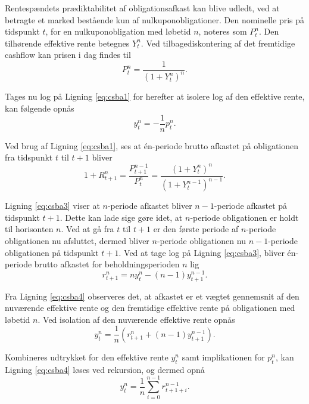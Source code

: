 \documentclass[
  a4paper,
  oneside]{memoir}
\begin{document}
Rentespændets prædiktabilitet af obligationsafkast kan blive udledt, ved at betragte et marked bestående kun af nulkuponobligationer. Den nominelle pris på tidspunkt \(t\), for en nulkuponobligation med løbetid \(n\), noteres som \(P_t^n\). Den tilhørende effektive rente betegnes \(Y_t^n\). Ved tilbagediskontering af det fremtidige cashflow kan prisen i dag findes til
\begin{equation}
P_t^n=\frac{1}{(1+Y_t^n)^n}. \label{eq:csba1}
\end{equation}

Tages nu log på Ligning \eqref{eq:csba1} for herefter at isolere log af den effektive rente, kan følgende opnås
\begin{equation}
y_t^n=-\frac{1}{n}p_t^n. \label{eq:csba2}
\end{equation}

Ved brug af Ligning \eqref{eq:csba1}, ses at én-periode brutto afkastet på obligationen fra tidspunkt \(t\) til \(t+1\) bliver
\begin{equation}
1+R_{t+1}^n=\frac{P_{t+1}^{n-1}}{P_t^n}=\frac{(1+Y_t^n)^n}{(1+Y_t^{n-1})^{n-1}}. \label{eq:csba3}
\end{equation}

Ligning \eqref{eq:csba3} viser at \(n\)-periode afkastet bliver \(n-1\)-periode afkastet på tidspunkt \(t+1\). Dette kan lade sige gøre idet, at \(n\)-periode obligationen er holdt til horisonten \(n\). Ved at gå fra \(t\) til \(t+1\) er den første periode af \(n\)-periode obligationen nu afsluttet, dermed bliver \(n\)-periode obligationen nu \(n-1\)-periode obligationen på tidspunkt \(t+1\). Ved at tage log på Ligning \eqref{eq:csba3}, bliver én-periode brutto afkastet for beholdningsperioden \(n\) lig
\begin{equation}
r_{t+1}^n=n y_t^n - (n-1) y_{t+1}^{n-1}. \label{eq:csba4}
\end{equation}

Fra Ligning \eqref{eq:csba4} observeres det, at afkastet er et vægtet gennemsnit af den nuværende effektive rente og den fremtidige effektive rente på obligationen med løbetid \(n\). Ved isolation af den nuværende effektive rente opnås
\begin{equation}
y_t^n = \frac{1}{n} \left(r_{t+1}^n + (n-1) y_{t+1}^{n-1}\right). \label{eq:csba5}
\end{equation}

Kombineres udtrykket for den effektive rente \(y_t^n\) samt implikationen for \(p_t^n\), kan Ligning \eqref{eq:csba4} løses ved rekursion, og dermed opnå
\begin{equation}
y_t^n = \frac{1}{n} \sum_{i=0}^{n-1} r_{t+1+i}^{n-1}. \label{eq:csba6}
\end{equation}
\end{document}
